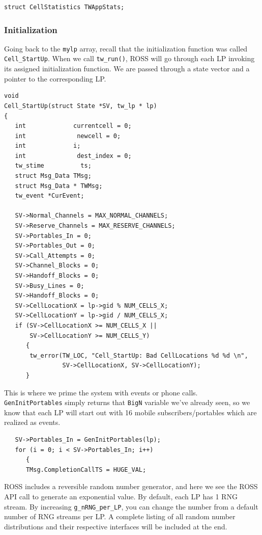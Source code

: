 \documentclass[12pt]{article}
\begin{document}
\begin{verbatim}
struct CellStatistics TWAppStats;
\end{verbatim}
 
\subsubsection{Initialization}
Going back to the {\tt mylp} array, recall that the initialization function
was called {\tt Cell\_StartUp}.  When we call {\tt tw\_run()}, ROSS will go through
each LP invoking its assigned initialization function.  We are passed
through a state vector and a pointer to the corresponding LP.

\begin{verbatim}
void
Cell_StartUp(struct State *SV, tw_lp * lp)
{
   int             currentcell = 0;
   int              newcell = 0;
   int             i;
   int              dest_index = 0;
   tw_stime          ts;
   struct Msg_Data TMsg;
   struct Msg_Data * TWMsg;
   tw_event *CurEvent;

   SV->Normal_Channels = MAX_NORMAL_CHANNELS;
   SV->Reserve_Channels = MAX_RESERVE_CHANNELS;
   SV->Portables_In = 0;
   SV->Portables_Out = 0;
   SV->Call_Attempts = 0;
   SV->Channel_Blocks = 0;
   SV->Handoff_Blocks = 0;
   SV->Busy_Lines = 0;
   SV->Handoff_Blocks = 0;
   SV->CellLocationX = lp->gid % NUM_CELLS_X;
   SV->CellLocationY = lp->gid / NUM_CELLS_X;
   if (SV->CellLocationX >= NUM_CELLS_X ||
       SV->CellLocationY >= NUM_CELLS_Y)
      {
       tw_error(TW_LOC, "Cell_StartUp: Bad CellLocations %d %d \n",
                SV->CellLocationX, SV->CellLocationY);
      }
\end{verbatim}

This is where we prime the system with events or phone calls.  {\tt
GenInitPortables} simply returns that {\tt BigN} variable we've
already seen, so we know that each LP will start out with 16 mobile
subscribers/portables which are realized as events.

\begin{verbatim}
   SV->Portables_In = GenInitPortables(lp);
   for (i = 0; i < SV->Portables_In; i++)
      {
      TMsg.CompletionCallTS = HUGE_VAL;
\end{verbatim}

ROSS includes a reversible random number generator, and here we see the ROSS
API call to generate an exponential value.  By default, each LP has 1 RNG
stream. By increasing {\tt g\_nRNG\_per\_LP}, you can change the number from a
default number of RNG streams per LP.  A complete listing of all random number
distributions and their respective interfaces will be included at the end.
\end{document}
